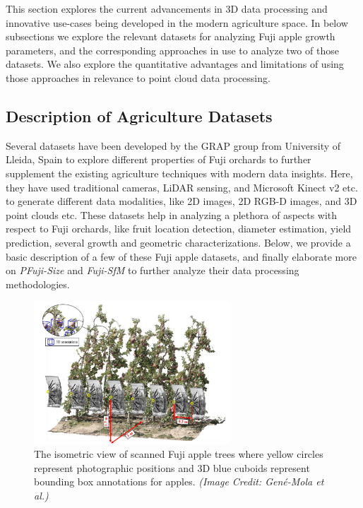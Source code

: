 \documentclass{article}
\begin{document}
This section explores the current advancements in 3D data processing and innovative use-cases being developed in the modern agriculture space.
In below subsections we explore the relevant datasets for analyzing Fuji apple growth parameters, and the corresponding approaches in use to analyze two of those datasets.
We also explore the quantitative advantages and limitations of using those approaches in relevance to point cloud data processing.


\subsection{Description of Agriculture Datasets}


Several datasets have been developed by the GRAP group from University of Lleida, Spain to explore different properties of Fuji orchards to further supplement the existing agriculture techniques with modern data insights.
Here, they have used traditional cameras, LiDAR sensing, and Microsoft Kinect v2 etc. to generate different data modalities, like 2D images, 2D RGB-D images, and 3D point clouds etc.
These datasets help in analyzing a plethora of aspects with respect to Fuji orchards, like fruit location detection, diameter estimation, yield prediction, several growth and geometric characterizations.
Below, we provide a basic description of a few of these Fuji apple datasets, and finally elaborate more on \textit{PFuji-Size} and \textit{Fuji-SfM} to further analyze their data processing methodologies.


\begin{figure}[h]
    \centering
    \includegraphics[width=0.65\textwidth]{fuji-sfm-dataset.png}
    \caption{The isometric view of scanned Fuji apple trees where yellow circles represent photographic positions and 3D blue cuboids represent bounding box annotations for apples. \textit{(Image Credit: Gen{\'e}-Mola et al.)}}
    \label{fig:fuji-sfm}
\end{figure}
\end{document}
